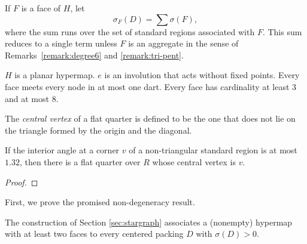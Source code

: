 If $F$ is a face of $H$, let
    $$\sigma_F(D) = \sum \sigma(F),$$
where the sum runs over the set of standard regions associated with
$F$.  This sum reduces to a single term unless $F$ is an aggregate
in the sense of Remarks~\ref{remark:degree6} and
\ref{remark:tri-pent}.



\begin{assumption}  $H$ is a planar hypermap.  $e$ is an
involution that acts without fixed points.  Every face meets every
node in at most one dart.  Every face has cardinality at least $3$
and at most $8$.
\end{assumption}


\begin{definition}
The {\it central vertex\/} of a flat quarter is defined to be the
one that does not lie on the triangle formed by the origin and the
diagonal.
%
\end{definition}

\begin{lemma}\label{lemma:1.32:bis}
If the interior angle at a corner $v$ of a non-triangular standard
region is at most $1.32$, then there is a flat quarter over $R$
whose central vertex is $v$.
\end{lemma}

\begin{proof} 
\end{proof}


First, we prove the promised non-degeneracy result.

\begin{lemma}
\label{prop:nonempty} The construction of Section
\ref{sec:stargraph} associates a (nonempty) hypermap with at least
two faces to every centered packing $D$ with $\sigma(D)>0$.
\end{lemma}

